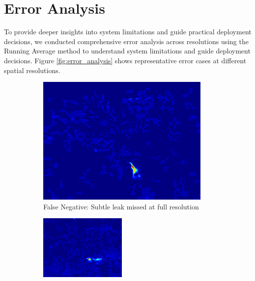 \section{Error Analysis}

To provide deeper insights into system limitations and guide practical deployment decisions, we conducted comprehensive error analysis across resolutions using the Running Average method to understand system limitations and guide deployment decisions. Figure \ref{fig:error_analysis} shows representative error cases at different spatial resolutions.

\begin{figure}[htbp]
\centering
\begin{subfigure}[t]{0.31\textwidth}
\centering
\includegraphics[width=\textwidth]{images/fn_sample_240x320.png}
\caption{False Negative: Subtle leak missed at full resolution}
\label{fig:fn_full}
\end{subfigure}
\hfill
\begin{subfigure}[t]{0.31\textwidth}
\centering
\includegraphics[width=\textwidth]{images/fn_sample_120x160.png}

\end{subfigure}
\end{figure}

